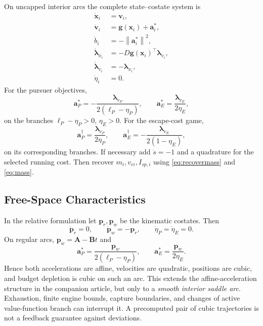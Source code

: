 \documentclass[journal,a4paper]{IEEEtran}
\newcommand{\norm}[1]{\left\|#1\right\|}
\begin{document}
On uncapped interior arcs the complete state--costate system is
\begin{subequations}\label{eq:canonical}
\begin{align}
 \dot{\mathbf x}_i&=\mathbf v_i,\\
 \dot{\mathbf v}_i&=\mathbf g(\mathbf x_i)+\mathbf a_i^*,\\
 \dot b_i&=-\norm{\mathbf a_i^*}^2,\\
 \dot{\boldsymbol\lambda}_{x_i}
    &=-D\mathbf g(\mathbf x_i)^\top\boldsymbol\lambda_{v_i},\\
 \dot{\boldsymbol\lambda}_{v_i}&=-\boldsymbol\lambda_{x_i},\\
 \dot\eta_i&=0.
\end{align}
\end{subequations}
For the pursuer objectives,
\begin{equation}
 \mathbf a_P^*=-\frac{\boldsymbol\lambda_{v_P}}{2(\ell_P-\eta_P)},
 \qquad
 \mathbf a_E^*=\frac{\boldsymbol\lambda_{v_E}}{2\eta_E},
 \label{eq:costateselect}
\end{equation}
on the branches $\ell_P-\eta_P>0$, $\eta_E>0$. For the escape-cost game,
\begin{equation}
 \mathbf a_P^{\dagger}=\frac{\boldsymbol\lambda_{v_P}}{2\eta_P},
 \qquad
 \mathbf a_E^{\dagger}=-\frac{\boldsymbol\lambda_{v_E}}{2(1-\eta_E)},
 \label{eq:costateselectE}
\end{equation}
on its corresponding branches. If necessary add $\dot s=-1$ and a quadrature for the selected running cost. Then recover $m_i,v_{ei},I_{\!sp,i}$ using \eqref{eq:recovermass} and \eqref{eq:mass}.

\subsection{Free-Space Characteristics}
In the relative formulation let $\mathbf p_r,\mathbf p_w$ be the kinematic costates. Then
\begin{equation}
 \dot{\mathbf p}_r=0,\qquad
 \dot{\mathbf p}_w=-\mathbf p_r,\qquad \dot\eta_P=\dot\eta_E=0.
 \label{eq:freecostate}
\end{equation}
On regular arcs, $\mathbf p_w=\mathbf A-\mathbf B t$ and
\begin{equation}
 \mathbf a_P^*=\frac{\mathbf p_w}{2(\ell_P-\eta_P)},\qquad
 \mathbf a_E^*=\frac{\mathbf p_w}{2\eta_E}.
 \label{eq:affinecontrols}
\end{equation}
Hence both accelerations are affine, velocities are quadratic, positions are cubic, and budget depletion is cubic on such an arc. This extends the affine-acceleration structure in the companion article, but only to a \emph{smooth interior saddle arc}. Exhaustion, finite engine bounds, capture boundaries, and changes of active value-function branch can interrupt it. A precomputed pair of cubic trajectories is not a feedback guarantee against deviations.
\end{document}
